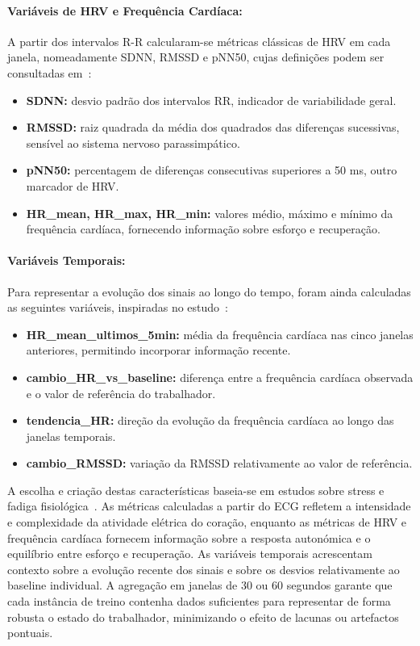 \paragraph{Variáveis de HRV e Frequência Cardíaca:}
A partir dos intervalos R-R calcularam-se métricas clássicas de HRV em cada janela, nomeadamente SDNN, RMSSD e pNN50, cujas definições podem ser consultadas em~\cite{shaffer2017}:
\begin{itemize}
\item \textbf{SDNN:} desvio padrão dos intervalos RR, indicador de variabilidade geral.
\item \textbf{RMSSD:} raiz quadrada da média dos quadrados das diferenças sucessivas, sensível ao sistema nervoso parassimpático.
\item \textbf{pNN50:} percentagem de diferenças consecutivas superiores a 50 ms, outro marcador de HRV.
\item \textbf{HR\_mean, HR\_max, HR\_min:} valores médio, máximo e mínimo da frequência cardíaca, fornecendo informação sobre esforço e recuperação.
\end{itemize}

\paragraph{Variáveis Temporais:}
Para representar a evolução dos sinais ao longo do tempo, foram ainda calculadas as seguintes variáveis, inspiradas no estudo~\cite{predictingdailyrecovery2024}:
\begin{itemize}
\item \textbf{HR\_mean\_ultimos\_5min:} média da frequência cardíaca nas cinco janelas anteriores, permitindo incorporar informação recente.
\item \textbf{cambio\_HR\_vs\_baseline:} diferença entre a frequência cardíaca observada e o valor de referência do trabalhador.
\item \textbf{tendencia\_HR:} direção da evolução da frequência cardíaca ao longo das janelas temporais.
\item \textbf{cambio\_RMSSD:} variação da RMSSD relativamente ao valor de referência.
\end{itemize}

A escolha e criação destas características baseia-se em estudos sobre stress e fadiga fisiológica~\cite{karthikeyan2023,mental_fatigue_ablation2025,ardecani2025}. As métricas calculadas a partir do ECG refletem a intensidade e complexidade da atividade elétrica do coração, enquanto as métricas de HRV e frequência cardíaca fornecem informação sobre a resposta autonómica e o equilíbrio entre esforço e recuperação. As variáveis temporais acrescentam contexto sobre a evolução recente dos sinais e sobre os desvios relativamente ao baseline individual. A agregação em janelas de 30 ou 60 segundos garante que cada instância de treino contenha dados suficientes para representar de forma robusta o estado do trabalhador, minimizando o efeito de lacunas ou artefactos pontuais.


